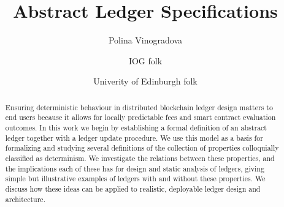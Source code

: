 \documentclass[runningheads]{llncs}
\newcommand{\UTXOma}{UTXO$_{\textsf{ma}}$}
\begin{document}
\lstset{
  basicstyle=\ttfamily,
  columns=fullflexible,
  keepspaces=true,
}

\title{Abstract Ledger Specifications}


\author{
  Polina Vinogradova
  \and
  IOG folk
  \and
  Univerity of Edinburgh folk
}



\maketitle


\begin{abstract}

Ensuring deterministic behaviour in distributed blockchain ledger design matters to end users because
it allows for locally predictable fees and smart contract evaluation outcomes.
In this work we begin by establishing a formal definition of an abstract ledger together with
a ledger update procedure. We use this model as a basis for formalizing and studying
several definitions of the collection of properties colloquially classified as
determinism. We investigate the relations between these properties, and the implications
each of these has for design and static analysis of ledgers, giving simple but
illustrative examples of ledgers with and without these properties.
We discuss how these ideas can be applied to realistic, deployable ledger
design and architecture.



\end{abstract}


%



%
%






\end{document}
